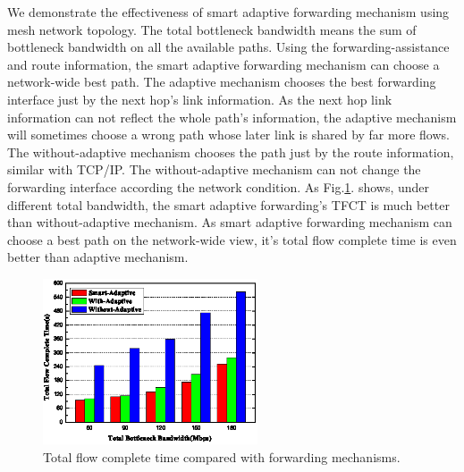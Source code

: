 We demonstrate the effectiveness of smart adaptive forwarding mechanism using mesh network topology. The total bottleneck bandwidth means the sum of bottleneck bandwidth on all the available paths. Using the forwarding-assistance and route information, the smart adaptive forwarding mechanism can choose a network-wide best path. The adaptive mechanism chooses the best forwarding interface just by the next hop's link information. As the next hop link information can not reflect the whole path's information, the adaptive mechanism will sometimes choose a wrong path whose later link is shared by far more flows. The without-adaptive mechanism chooses the path just by the route information, similar with TCP/IP.  The without-adaptive mechanism can not change the forwarding interface according the network condition. As Fig.\ref{fig-tfct}. shows, under different total bandwidth, the smart adaptive forwarding's TFCT is much better than without-adaptive mechanism. As smart adaptive forwarding mechanism can choose a best path on the network-wide view, it's total flow complete time is even better than adaptive mechanism.
\begin{figure}[t]
\centering
\includegraphics[width=2.5in]{adaptive-pic-cut.eps}
\centering
\caption{Total flow complete time compared with forwarding mechanisms.}
\label{fig-tfct}
\end{figure}

